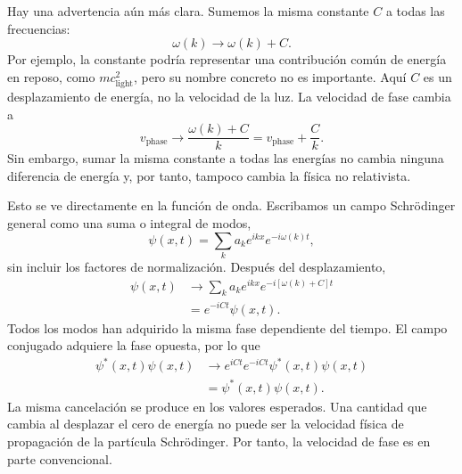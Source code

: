 Hay una advertencia aún más clara. Sumemos la misma constante \(C\) a todas las frecuencias:
\begin{equation}
\omega(k)\longrightarrow \omega(k)+C.
\end{equation}
Por ejemplo, la constante podría representar una contribución común de energía en reposo, como \(mc_{\mathrm{light}}^2\), pero su nombre concreto no es importante. Aquí \(C\) es un desplazamiento de energía, no la velocidad de la luz. La velocidad de fase cambia a
\begin{equation}
v_{\mathrm{phase}}\longrightarrow
\frac{\omega(k)+C}{k}
=v_{\mathrm{phase}}+\frac{C}{k}.
\end{equation}
Sin embargo, sumar la misma constante a todas las energías no cambia ninguna diferencia de energía y, por tanto, tampoco cambia la física no relativista.

Esto se ve directamente en la función de onda. Escribamos un campo Schr\"odinger general como una suma o integral de modos,
\begin{equation}
\psi(x,t)=\sum_k a_k e^{ikx}e^{-i\omega(k)t},
\end{equation}
sin incluir los factores de normalización. Después del desplazamiento,
\begin{align}
\psi(x,t)
&\longrightarrow
\sum_k a_k e^{ikx}e^{-i[\omega(k)+C]t}
\\
&=e^{-iCt}\psi(x,t).
\end{align}
Todos los modos han adquirido la misma fase dependiente del tiempo. El campo conjugado adquiere la fase opuesta, por lo que
\begin{equation}
\begin{aligned}
\psi^*(x,t)\psi(x,t)
&\longrightarrow
e^{iCt}e^{-iCt}\psi^*(x,t)\psi(x,t)
\\
&=\psi^*(x,t)\psi(x,t).
\end{aligned}
\end{equation}
La misma cancelación se produce en los valores esperados. Una cantidad que cambia al desplazar el cero de energía no puede ser la velocidad física de propagación de la partícula Schr\"odinger. Por tanto, la velocidad de fase es en parte convencional.

